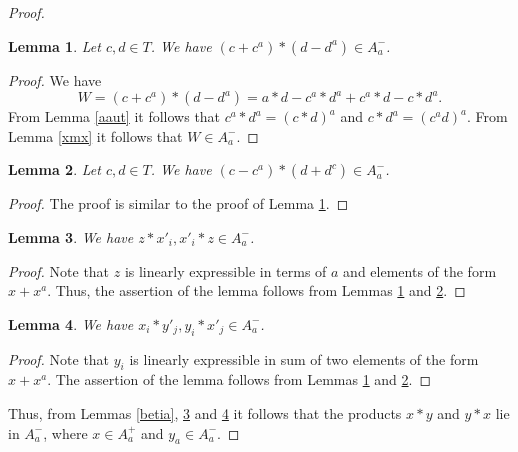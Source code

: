 \documentclass[10pt,a4paper]{amsart}
\newtheorem{lem}{Lemma}
\begin{document}
\begin{proof}
		
	
	\begin{lem}\label{cd}
	Let $c,d\in T$. We have $(c+c^a)*(d-d^a)\in A^-_a$.
	\end{lem}
	\begin{proof}
	We have $$W=(c+c^a)*(d-d^a)=a*d-c^a*d^a+c^a*d-c*d^a.$$
From Lemma \ref{aaut} it follows that $c^a*d^a=(c*d)^a$ and $c*d^a=(c^ad)^a$.
From Lemma \ref{xmx} it follows that $W\in A^-_a$.

	\end{proof}
	
	\begin{lem}\label{dc}
	Let $c,d\in T$. We have $(c-c^a)*(d+d^c)\in A^-_a$.
	\end{lem}
	\begin{proof}
The proof is similar to the proof of Lemma \ref{cd}.
	\end{proof}

	\begin{lem}\label{zbet}
	We have $z*x'_i, x'_i*z\in A^-_a$.
	\end{lem}
	\begin{proof}
Note that $z$ is linearly expressible in terms of $a$ and elements of the form $x+x^a$. Thus, the assertion of the lemma follows from Lemmas \ref{cd} and \ref{dc}.

	\end{proof}
	
	\begin{lem}\label{alpbet}
	We have $x_i*y'_j, y_i*x'_j\in A^-_a$.
    \end{lem}	 
	\begin{proof}
		Note that $y_i$ is linearly expressible in sum of two elements of the form $x+x^a$. The assertion of the lemma follows from Lemmas \ref{cd} and \ref{dc}.
	\end{proof} 
Thus, from Lemmas \ref{betia}, \ref{zbet} and \ref{alpbet} it follows that the products $x*y$ and $y*x$ lie in $A_a^- $, where $x\in A_a^+$ and $y_a\in A^-_a$.
	 

\end{proof}
\end{document}

